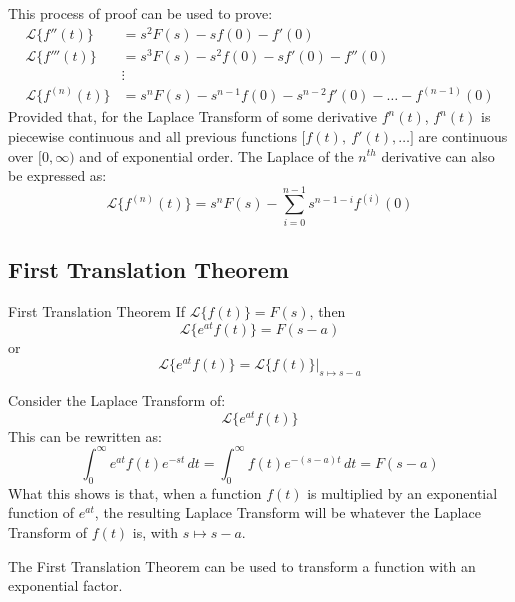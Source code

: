 \documentclass[12pt]{article}
\begin{document}
This process of proof can be used to prove:
\begin{align*}
  \mathcal{L}\big\{f''(t)\big\} &= s^2F(s) - sf(0) - f'(0) \\
  \mathcal{L}\big\{f'''(t)\big\} &= s^3F(s) - s^2f(0) - sf'(0) - f''(0) \\
                                 &\vdots \\
  \mathcal{L}\big\{f^{(n)}(t)\big\} &= s^nF(s) - s^{n-1}f(0) - s^{n-2}f'(0) - \hdots - f^{(n-1)}(0)
\end{align*}
Provided that, for the Laplace Transform of some derivative $f^{n}(t)$, $f^{n}(t)$ is piecewise continuous and all previous functions $\big[f(t),\ f'(t), \hdots\big]$ are continuous over $[0,\infty)$ and of exponential order. The Laplace of the $n^{th}$ derivative can also be expressed as:
\begin{equation*}
  \mathcal{L}\big\{f^{(n)}(t)\big\} = s^nF(s) - \sum_{i=0}^{n-1} s^{n-1-i}f^{(i)}(0)
\end{equation*}

\subsection{First Translation Theorem}
\label{ssec:firstTranslationTheorem}
\begin{definition}{First Translation Theorem}
  If $\mathcal{L}\big\{f(t)\big\}=F(s)$, then
  \begin{equation*}
    \mathcal{L}\big\{e^{at}f(t)\big\}=F(s-a)
  \end{equation*}
  or
  \begin{equation*}
    \mathcal{L}\big\{e^{at}f(t)\big\}=\mathcal{L}\big\{f(t)\big\}\Big\vert_{s\mapsto s-a}
  \end{equation*}
\end{definition}
Consider the Laplace Transform of:
\begin{equation*}
  \mathcal{L}\big\{e^{at}f(t)\big\}
\end{equation*}
This can be rewritten as:
\begin{equation*}
  \int_{0}^{\infty} e^{at}f(t)e^{-st} \,dt = \int_{0}^{\infty} f(t)e^{-(s-a)t} \, dt = F(s-a)
\end{equation*}
What this shows is that, when a function $f(t)$ is multiplied by an exponential function of $e^{at}$, the resulting Laplace Transform will be whatever the Laplace Transform of $f(t)$ is, with $s \mapsto s-a$.

The First Translation Theorem can be used to transform a function with an exponential factor.
\end{document}

